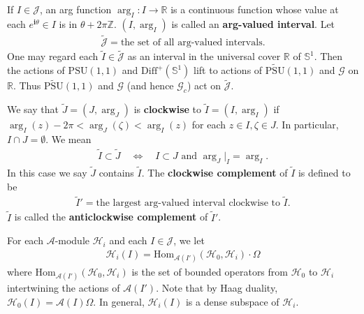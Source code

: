 \documentclass[12pt,a4paper,notitlepage]{article}
\theoremstyle{definition}
\theoremstyle{plain}
\newcommand{\mc}{\mathcal}
\newcommand{\wtd}{\widetilde}
\newcommand{\Hom}{\mathrm{Hom}}
\newcommand{\Diffp}{\mathrm{Diff}^+}
\newcommand{\PSU}{\mathrm{PSU}(1,1)}
\newcommand{\scr}{\mathscr}
\newcommand{\Jtd}{\widetilde{\mathcal J}}
\newcommand{\im}{\mathbf{i}}
\newcommand{\Zbb}{\mathbb Z}
\newcommand{\Rbb}{\mathbb R}
\newcommand{\UPSU}{\widetilde{\mathrm{PSU}}(1,1)}
\newcommand{\Sbb}{{\mathbb S}}
\newcommand{\Gc}{\mathscr G_c}
\numberwithin{equation}{section}
\begin{document}
If $I\in\mc J$, an arg function $\arg_I:I\rightarrow\Rbb$ is a continuous function whose value at each $e^{\im\theta}\in I$ is in $\theta+2\pi\Zbb$. $(I,\arg_I)$ is called an \textbf{arg-valued interval}. Let
\begin{align*}
\Jtd=\text{the set of all arg-valued intervals}.	
\end{align*}
One may regard each $\wtd I\in\Jtd$ as an interval in the universal cover $\Rbb$ of $\Sbb^1$. Then the actions of $\PSU$ and $\Diffp(\Sbb^1)$ lift to actions of $\UPSU$ and $\scr G$ on $\Rbb$. Thus $\UPSU$ and $\scr G$ (and hence $\Gc$) act on $\Jtd$.  

We say that $\wtd J=(J,\arg_J)$ is \textbf{clockwise} to $\wtd I=(I,\arg_I)$ if   $\arg_I(z)-2\pi<\arg_J(\zeta)<\arg_I(z)$ for each $z\in I,\zeta\in J$. In particular, $I\cap J=\emptyset$. We mean
\begin{align*}
\wtd I	\subset\wtd J\quad\Leftrightarrow\quad \text{$I\subset J$ and $\arg_J|_I=\arg_I$}.
\end{align*}
In this case we say $\wtd J$ contains $\wtd I$. The \textbf{clockwise complement} of $\wtd I$ is defined to be
\begin{align*}
	\wtd I'=\text{the largest arg-valued interval clockwise to $\wtd I$}.
\end{align*} 
$\wtd I$ is called the \textbf{anticlockwise complement} of $\wtd I'$.





For each $\mc A$-module $\mc H_i$ and each $I\in\mc J$, we let
\begin{align*}
\mc H_i(I)=\Hom_{\mc A(I')}(\mc H_0,\mc H_i)\cdot\Omega
\end{align*}
where $\Hom_{\mc A(I')}(\mc H_0,\mc H_i)$ is the set of bounded operators from $\mc H_0$ to $\mc H_i$ intertwining the actions of $\mc A(I')$. Note that by Haag duality, $\mc H_0(I)=\mc A(I)\Omega$. In general,  $\mc H_i(I)$ is a dense subspace of $\mc H_i$.
\end{document}

